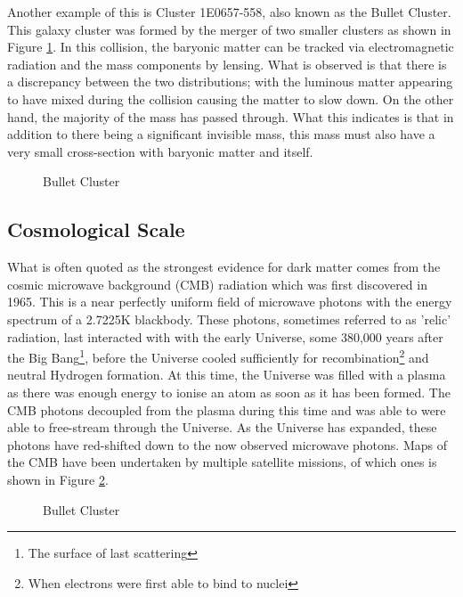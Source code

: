 \par
Another example of this is Cluster 1E0657-558, also known as the Bullet Cluster.
This galaxy cluster was formed by the merger of two smaller clusters as shown in Figure \ref{fig:DM_Evidence_Bullet_Cluster}.
In this collision, the baryonic matter can be tracked via electromagnetic radiation and the mass components by lensing.
What is observed is that there is a discrepancy between the two distributions; with the luminous matter appearing to have mixed during the collision causing the matter to slow down.
On the other hand, the majority of the mass has passed through.
What this indicates is that in addition to there being a significant invisible mass, this mass must also have a very small cross-section with baryonic matter and itself.
\begin{figure}[!htbp]%
    \centering
    \caption{Bullet Cluster}
    \label{fig:DM_Evidence_Bullet_Cluster}
\end{figure}


\subsection{Cosmological Scale}
\par
What is often quoted as the strongest evidence for dark matter comes from the cosmic microwave background (CMB) radiation which was first discovered in 1965.
This is a near perfectly uniform field of microwave photons with the energy spectrum of a 2.7225K blackbody.
These photons, sometimes referred to as 'relic' radiation, last interacted with with the early Universe, some 380,000 years after the Big Bang\footnote{The surface of last scattering}, before the Universe cooled sufficiently for recombination\footnote{When electrons were first able to bind to nuclei} and neutral Hydrogen formation.
At this time, the Universe was filled with a plasma as there was enough energy to ionise an atom as soon as it has been formed.
The CMB photons decoupled from the plasma during this time and was able to were able to free-stream through the Universe.
As the Universe has expanded, these photons have red-shifted down to the now observed microwave photons.
Maps of the CMB have been undertaken by multiple satellite missions, of which ones is shown in Figure \ref{fig:DM_Evidence_CMB_Map}.

\begin{figure}[!htbp]%
    \centering
    \caption{Bullet Cluster}
    \label{fig:DM_Evidence_CMB_Map}
\end{figure}

